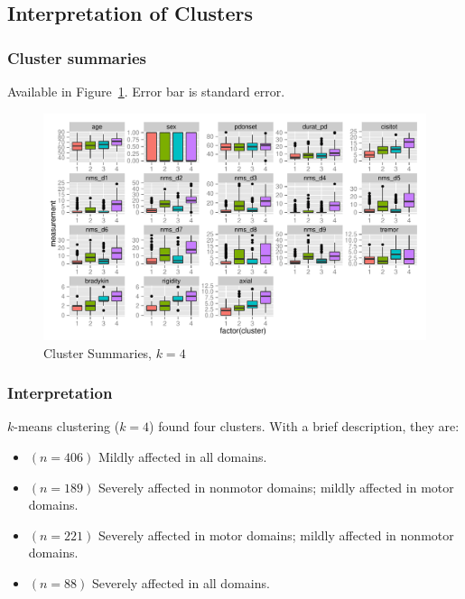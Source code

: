 \documentclass[10pt]{article}
\begin{document}
\subsection{Interpretation of Clusters}

\subsubsection{Cluster summaries}

Available in Figure~\ref{fig:kmeans-summaries-4}. Error bar is standard error.

\begin{figure}[h]
  \centering
  \includegraphics[width=\linewidth]{kmeans-summaries-4.pdf}
  \caption{Cluster Summaries, $k = 4$}
  \label{fig:kmeans-summaries-4}
\end{figure}

\subsubsection{Interpretation}
$k$-means clustering ($k = 4$) found four clusters. With a brief description,
they are:

\begin{itemize}
  \item[1.] $(n = 406)$ Mildly affected in all domains.
  \item[2.] $(n = 189)$ Severely affected in nonmotor domains; mildly
    affected in motor domains.
  \item[3.] $(n = 221)$ Severely affected in motor domains; mildly
    affected in nonmotor domains.
  \item[4.] $(n = 88)$ Severely affected in all domains.
\end{itemize}
\end{document}
